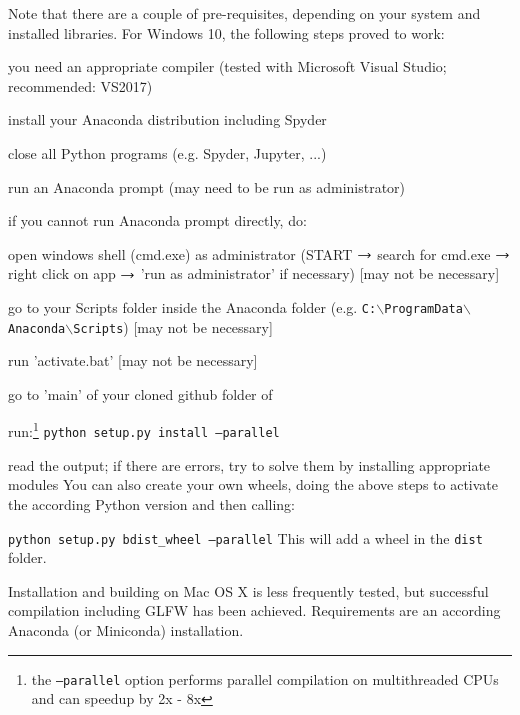 Note that there are a couple of pre-requisites, depending on your system and installed libraries. For Windows 10, the following steps proved to work:
\bi
  \item you need an appropriate compiler (tested with Microsoft Visual Studio; recommended: VS2017)
  \item install your Anaconda distribution including Spyder
  \item close all Python programs (e.g. Spyder, Jupyter, ...) 
  \item run an Anaconda prompt (may need to be run as administrator)
  \item if you cannot run Anaconda prompt directly, do:
  \bi
    \item open windows shell (cmd.exe) as administrator (START $\rightarrow$ search for cmd.exe $\rightarrow$ right click on app $\rightarrow$ 'run as administrator' if necessary) [may not be necessary]
    \item go to your Scripts folder inside the Anaconda folder (e.g. \texttt{C:$\backslash$ProgramData$\backslash$Anaconda$\backslash$Scripts}) [may not be necessary]
    \item run 'activate.bat' [may not be necessary]
  \ei
  \item go to 'main' of your cloned github folder of \codeName 
  \item run:\footnote{the \texttt{--parallel} option performs parallel compilation on multithreaded CPUs and can speedup by 2x - 8x} \texttt{python setup.py install --parallel}
  \item read the output; if there are errors, try to solve them by installing appropriate modules
\ei
You can also create your own wheels, doing the above steps to activate the according Python version and then calling:
\bi
  \item[] \texttt{python setup.py bdist\_wheel --parallel}
\ei
This will add a wheel in the \texttt{dist} folder.

Installation and building on Mac OS X is less frequently tested, but successful compilation including GLFW has been achieved.
Requirements are an according Anaconda (or Miniconda) installation.

